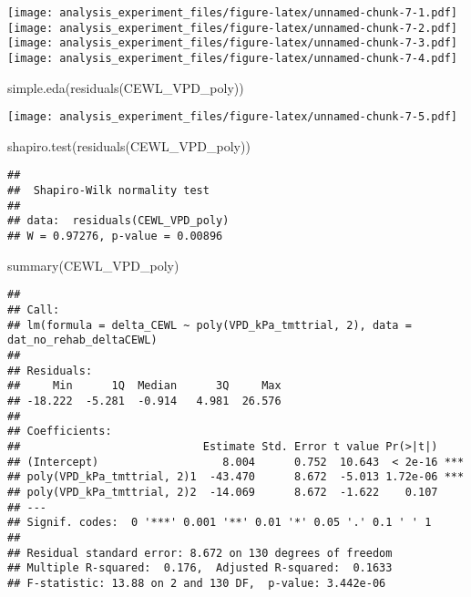 \documentclass[
]{article}
\newenvironment{Shaded}{\begin{snugshade}}{\end{snugshade}}
\newcommand{\FunctionTok}[1]{\textcolor[rgb]{0.00,0.00,0.00}{#1}}
\newcommand{\NormalTok}[1]{#1}
\begin{document}
\texttt{[image: analysis\_experiment\_files/figure-latex/unnamed-chunk-7-1.pdf]}
\texttt{[image: analysis\_experiment\_files/figure-latex/unnamed-chunk-7-2.pdf]}
\texttt{[image: analysis\_experiment\_files/figure-latex/unnamed-chunk-7-3.pdf]}
\texttt{[image: analysis\_experiment\_files/figure-latex/unnamed-chunk-7-4.pdf]}

\begin{Shaded}
\begin{Highlighting}[]
\FunctionTok{simple.eda}\NormalTok{(}\FunctionTok{residuals}\NormalTok{(CEWL\_VPD\_poly))}
\end{Highlighting}
\end{Shaded}

\texttt{[image: analysis\_experiment\_files/figure-latex/unnamed-chunk-7-5.pdf]}

\begin{Shaded}
\begin{Highlighting}[]
\FunctionTok{shapiro.test}\NormalTok{(}\FunctionTok{residuals}\NormalTok{(CEWL\_VPD\_poly))}
\end{Highlighting}
\end{Shaded}

\begin{verbatim}
## 
##  Shapiro-Wilk normality test
## 
## data:  residuals(CEWL_VPD_poly)
## W = 0.97276, p-value = 0.00896
\end{verbatim}

\begin{Shaded}
\begin{Highlighting}[]
\FunctionTok{summary}\NormalTok{(CEWL\_VPD\_poly)}
\end{Highlighting}
\end{Shaded}

\begin{verbatim}
## 
## Call:
## lm(formula = delta_CEWL ~ poly(VPD_kPa_tmttrial, 2), data = dat_no_rehab_deltaCEWL)
## 
## Residuals:
##     Min      1Q  Median      3Q     Max 
## -18.222  -5.281  -0.914   4.981  26.576 
## 
## Coefficients:
##                            Estimate Std. Error t value Pr(>|t|)    
## (Intercept)                   8.004      0.752  10.643  < 2e-16 ***
## poly(VPD_kPa_tmttrial, 2)1  -43.470      8.672  -5.013 1.72e-06 ***
## poly(VPD_kPa_tmttrial, 2)2  -14.069      8.672  -1.622    0.107    
## ---
## Signif. codes:  0 '***' 0.001 '**' 0.01 '*' 0.05 '.' 0.1 ' ' 1
## 
## Residual standard error: 8.672 on 130 degrees of freedom
## Multiple R-squared:  0.176,  Adjusted R-squared:  0.1633 
## F-statistic: 13.88 on 2 and 130 DF,  p-value: 3.442e-06
\end{verbatim}
\end{document}
